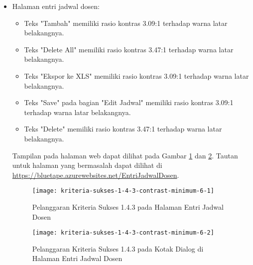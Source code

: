 \begin{itemize}
    \item Halaman entri jadwal dosen: 
    \begin{itemize}
        \item Teks "Tambah" memiliki rasio kontras 3.09:1 terhadap warna latar belakangnya.
        \item Teks "Delete All" memiliki rasio kontras 3.47:1 terhadap warna latar belakangnya.
        \item Teks "Ekspor ke XLS" memiliki rasio kontras 3.09:1 terhadap warna latar belakangnya.
        \item Teks "Save" pada bagian "Edit Jadwal" memiliki rasio kontras 3.09:1 terhadap warna latar belakangnya.
        \item Teks "Delete" memiliki rasio kontras 3.47:1 terhadap warna latar belakangnya.
    \end{itemize}
    Tampilan pada halaman web dapat dilihat pada Gambar \ref{fig:1.4.3_contrast_minimum_6_1} dan \ref{fig:1.4.3_contrast_minimum_6_2}. Tautan untuk halaman yang bermasalah dapat dilihat di \url{https://bluetape.azurewebsites.net/EntriJadwalDosen}.	
    \begin{figure}[H]
        \centering  
        \texttt{[image: kriteria-sukses-1-4-3-contrast-minimum-6-1]}  
        \caption[Pelanggaran Kriteria Sukses 1.4.3 pada Halaman Entri Jadwal Dosen]{Pelanggaran Kriteria Sukses 1.4.3 pada Halaman Entri Jadwal Dosen}
        \label{fig:1.4.3_contrast_minimum_6_1}  
    \end{figure} 
    
    \begin{figure}[H]
        \centering  
        \texttt{[image: kriteria-sukses-1-4-3-contrast-minimum-6-2]}  
        \caption[Pelanggaran Kriteria Sukses 1.4.3 pada Kotak Dialog di Halaman Entri Jadwal Dosen]{Pelanggaran Kriteria Sukses 1.4.3 pada Kotak Dialog di Halaman Entri Jadwal Dosen}
        \label{fig:1.4.3_contrast_minimum_6_2}  
    \end{figure} 


\end{itemize}
